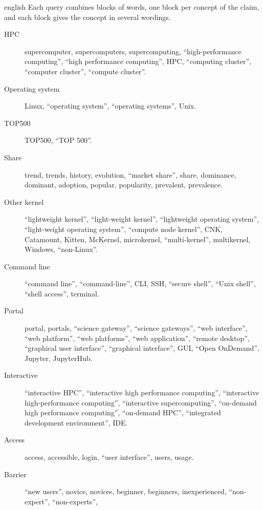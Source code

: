 \begin{onlyin}{english}
Each query combines blocks of words, one block per concept of the claim,
and each block gives the concept in several wordings.
\begingroup\raggedright
\begin{description}
  \item[HPC] supercomputer, supercomputers, supercomputing,
    \enquote{high-performance computing}, \enquote{high performance
    computing}, HPC, \enquote{computing cluster}, \enquote{computer
    cluster}, \enquote{compute cluster}.
  \item[Operating system] Linux, \enquote{operating system},
    \enquote{operating systems}, Unix.
  \item[TOP500] TOP500, \enquote{TOP 500}.
  \item[Share] trend, trends, history, evolution, \enquote{market
    share}, share, dominance, dominant, adoption, popular, popularity,
    prevalent, prevalence.
  \item[Other kernel] \enquote{lightweight kernel}, \enquote{light-weight
    kernel}, \enquote{lightweight operating system},
    \enquote{light-weight operating system}, \enquote{compute node
    kernel}, CNK, Catamount, Kitten, McKernel, microkernel,
    \enquote{multi-kernel}, multikernel, Windows, \enquote{non-Linux}.
  \item[Command line] \enquote{command line}, \enquote{command-line},
    CLI, SSH, \enquote{secure shell}, \enquote{Unix shell},
    \enquote{shell access}, terminal.
  \item[Portal] portal, portals, \enquote{science gateway},
    \enquote{science gateways}, \enquote{web interface}, \enquote{web
    platform}, \enquote{web platforms}, \enquote{web application},
    \enquote{remote desktop}, \enquote{graphical user interface},
    \enquote{graphical interface}, GUI, \enquote{Open OnDemand},
    Jupyter, JupyterHub.
  \item[Interactive] \enquote{interactive HPC}, \enquote{interactive
    high performance computing}, \enquote{interactive high-performance
    computing}, \enquote{interactive supercomputing}, \enquote{on-demand
    high performance computing}, \enquote{on-demand HPC},
    \enquote{integrated development environment}, IDE.
  \item[Access] access, accessible, login, \enquote{user interface},
    users, usage.
  \item[Barrier] \enquote{new users}, novice, novices, beginner,
    beginners, inexperienced, \enquote{non-expert}, \enquote{non-experts},

\end{description}
\end{onlyin}
